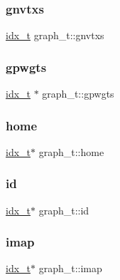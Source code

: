 \subsubsection{\texorpdfstring{gnvtxs}{gnvtxs}}
{\footnotesize\ttfamily \hyperlink{a00876_aaa5262be3e700770163401acb0150f52}{idx\+\_\+t} graph\+\_\+t\+::gnvtxs}

\mbox{\label{a00734_aac4a3a6303e640b9fe49fe2de6329699}} 
\subsubsection{\texorpdfstring{gpwgts}{gpwgts}}
{\footnotesize\ttfamily \hyperlink{a00876_aaa5262be3e700770163401acb0150f52}{idx\+\_\+t} $\ast$ graph\+\_\+t\+::gpwgts}

\mbox{\label{a00734_a5c8fc01c4001be25d4b14d1ef967a3a4}} 
\subsubsection{\texorpdfstring{home}{home}}
{\footnotesize\ttfamily \hyperlink{a00876_aaa5262be3e700770163401acb0150f52}{idx\+\_\+t}$\ast$ graph\+\_\+t\+::home}

\mbox{\label{a00734_a09e4ad93b604f774a96eee64b603135b}} 
\subsubsection{\texorpdfstring{id}{id}}
{\footnotesize\ttfamily \hyperlink{a00876_aaa5262be3e700770163401acb0150f52}{idx\+\_\+t}$\ast$ graph\+\_\+t\+::id}

\mbox{\label{a00734_a6a2f7b7ac13bbaac6fd37c2a40b8b8e8}} 
\subsubsection{\texorpdfstring{imap}{imap}}
{\footnotesize\ttfamily \hyperlink{a00876_aaa5262be3e700770163401acb0150f52}{idx\+\_\+t}$\ast$ graph\+\_\+t\+::imap}

